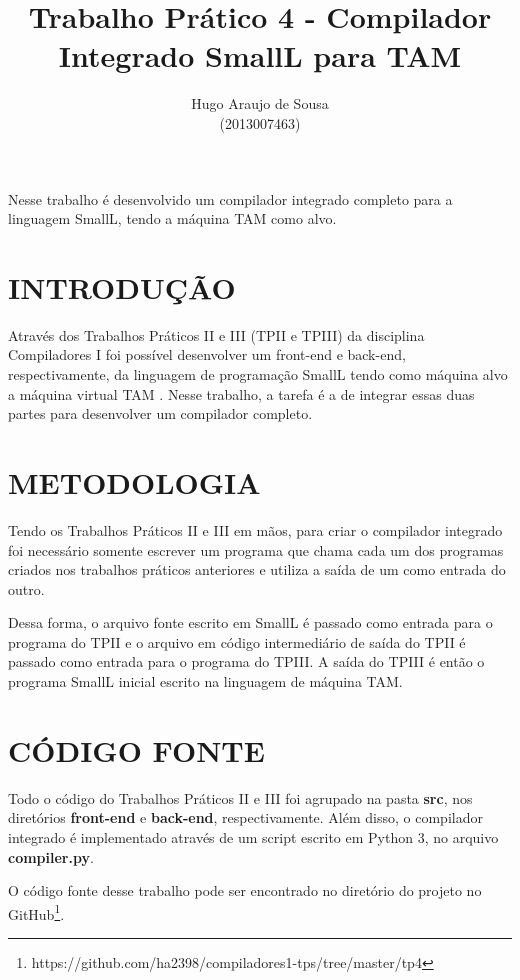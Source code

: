 \documentclass[12pt]{article}
\title{Trabalho Prático 4 - Compilador Integrado SmallL para TAM}
\author{Hugo Araujo de Sousa\\(2013007463)}
\begin{document}
 

\maketitle
     
\begin{resumo}
  Nesse trabalho é desenvolvido um compilador integrado completo para a linguagem SmallL,
  tendo a máquina TAM como alvo.
\end{resumo}

\section{INTRODUÇÃO}

Através dos Trabalhos Práticos II e III (TPII e TPIII) da disciplina Compiladores I foi possível desenvolver um front-end e back-end,
respectivamente, da linguagem de programação SmallL tendo como máquina alvo a máquina virtual TAM \cite{Watt:2007:PLP:1557477}.
Nesse trabalho, a tarefa é a de integrar essas duas partes para desenvolver um compilador completo.

\section{METODOLOGIA} \label{sec:met}

Tendo os Trabalhos Práticos II e III em mãos, para criar o compilador integrado foi necessário somente escrever um programa
que chama cada um dos programas criados nos trabalhos práticos anteriores e utiliza a saída de um como entrada do outro.

Dessa forma, o arquivo fonte escrito em SmallL é passado como entrada para o programa do TPII e o arquivo em código intermediário
de saída do TPII é passado como entrada para o programa do TPIII. A saída do TPIII é então o programa SmallL inicial escrito
na linguagem de máquina TAM.

\section{CÓDIGO FONTE}

Todo o código do Trabalhos Práticos II e III foi agrupado na pasta \textbf{src}, nos diretórios \textbf{front-end} e
\textbf{back-end}, respectivamente. Além disso, o compilador integrado é implementado através de um script escrito em Python 3,
no arquivo \textbf{compiler.py}.

O código fonte desse trabalho pode ser encontrado no diretório do projeto no
GitHub\footnote{https://github.com/ha2398/compiladores1-tps/tree/master/tp4}.
\end{document}
